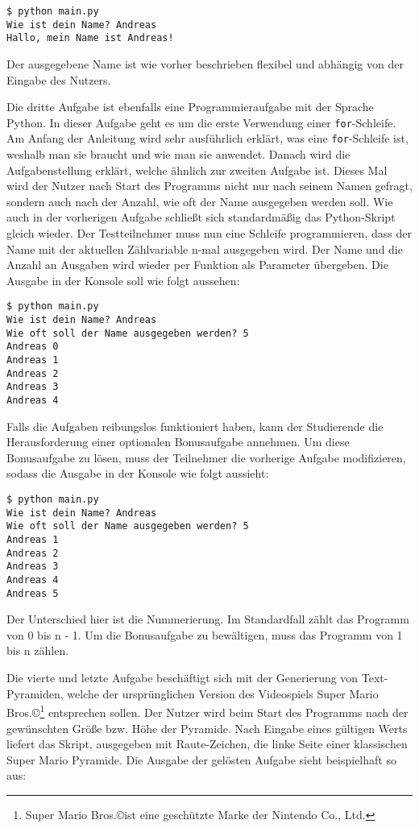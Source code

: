 \begin{lstlisting}[style=Bash]
$ python main.py
Wie ist dein Name? Andreas
Hallo, mein Name ist Andreas!
\end{lstlisting}

Der ausgegebene Name ist wie vorher beschrieben flexibel und abhängig von der
Eingabe des Nutzers.

Die dritte Aufgabe ist ebenfalls eine Programmieraufgabe mit der Sprache Python.
In dieser Aufgabe geht es um die erste Verwendung einer \texttt{for}-Schleife.
Am Anfang der Anleitung wird sehr ausführlich erklärt, was eine
\texttt{for}-Schleife ist, weshalb man sie braucht und wie man sie anwendet.
Danach wird die Aufgabenstellung erklärt, welche ähnlich zur zweiten Aufgabe
ist. Dieses Mal wird der Nutzer nach Start des Programms nicht nur nach seinem
Namen gefragt, sondern auch nach der Anzahl, wie oft der Name ausgegeben werden
soll. Wie auch in der vorherigen Aufgabe schließt sich standardmäßig das
Python-Skript gleich wieder. Der Testteilnehmer muss nun eine Schleife
programmieren, dass der Name mit der aktuellen Zählvariable n-mal ausgegeben
wird. Der Name und die Anzahl an Ausgaben wird wieder per Funktion als Parameter
übergeben. Die Ausgabe in der Konsole soll wie folgt aussehen:

\begin{lstlisting}[style=Bash]
$ python main.py
Wie ist dein Name? Andreas
Wie oft soll der Name ausgegeben werden? 5
Andreas 0
Andreas 1
Andreas 2
Andreas 3
Andreas 4
\end{lstlisting}

Falls die Aufgaben reibungslos funktioniert haben, kann der Studierende
die Herausforderung einer optionalen Bonusaufgabe annehmen. Um diese
Bonusaufgabe zu lösen, muss der Teilnehmer die vorherige Aufgabe modifizieren,
sodass die Ausgabe in der Konsole wie folgt aussieht:

\begin{lstlisting}[style=Bash]
$ python main.py
Wie ist dein Name? Andreas
Wie oft soll der Name ausgegeben werden? 5
Andreas 1
Andreas 2
Andreas 3
Andreas 4
Andreas 5
\end{lstlisting}

Der Unterschied hier ist die Nummerierung. Im Standardfall zählt das Programm
von 0 bis n - 1. Um die Bonusaufgabe zu bewältigen, muss das Programm von 1 bis
n zählen.

Die vierte und letzte Aufgabe beschäftigt sich mit der Generierung von
Text-Pyramiden, welche der ursprünglichen Version des Videospiels Super Mario
Bros.\copyright\footnote{Super Mario Bros.\copyright ist eine geschützte Marke
der Nintendo Co., Ltd.} entsprechen sollen. Der Nutzer wird beim Start des
Programms nach der gewünschten Größe bzw. Höhe der Pyramide. Nach Eingabe eines
gültigen  Werts liefert das Skript, ausgegeben mit Raute-Zeichen, die linke
Seite einer klassischen Super Mario Pyramide. Die Ausgabe der gelösten Aufgabe
sieht beispielhaft so aus:

